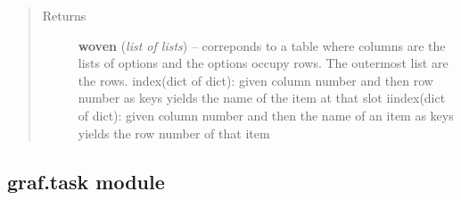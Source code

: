 \documentclass[letterpaper,10pt,english]{sphinxmanual}
\begin{document}
\begin{fulllineitems}
\begin{fulllineitems}
\begin{quote}
\begin{description}
\item[{Returns}] \leavevmode
\textbf{woven} (\emph{list of lists}) --
correponds to a table where columns are the lists of options
and the options occupy rows. The outermost list are the rows.
index(dict of dict): given column number and then row number as keys yields the
name of the item at that slot
iindex(dict of dict): given column number and then the name of an item as keys yields the
row number of that item

\end{description}\end{quote}

\end{fulllineitems}


\end{fulllineitems}



\subsection{graf.task module}
\label{graf/graf:graf-task-module}\label{graf/graf:module-graf.task}
\end{document}
